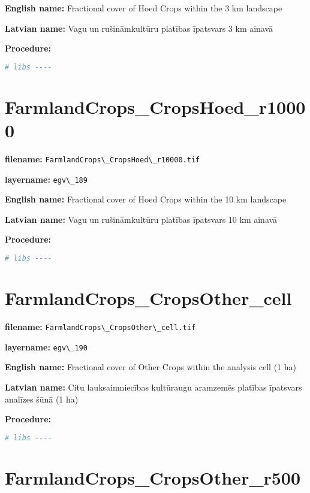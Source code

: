 \documentclass[
]{book}
\newcommand{\passthrough}[1]{#1}
\begin{document}
\textbf{English name:} Fractional cover of Hoed Crops within the 3 km landscape

\textbf{Latvian name:} Vagu un rušināmkultūru platības īpatsvars 3 km ainavā

\textbf{Procedure:}

\begin{lstlisting}[language=R]
# libs ----
\end{lstlisting}

\section{FarmlandCrops\_CropsHoed\_r10000}\label{ch06.189}

\textbf{filename:} \passthrough{\lstinline!FarmlandCrops\_CropsHoed\_r10000.tif!}

\textbf{layername:} \passthrough{\lstinline!egv\_189!}

\textbf{English name:} Fractional cover of Hoed Crops within the 10 km landscape

\textbf{Latvian name:} Vagu un rušināmkultūru platības īpatsvars 10 km ainavā

\textbf{Procedure:}

\begin{lstlisting}[language=R]
# libs ----
\end{lstlisting}

\section{FarmlandCrops\_CropsOther\_cell}\label{ch06.190}

\textbf{filename:} \passthrough{\lstinline!FarmlandCrops\_CropsOther\_cell.tif!}

\textbf{layername:} \passthrough{\lstinline!egv\_190!}

\textbf{English name:} Fractional cover of Other Crops within the analysis cell (1 ha)

\textbf{Latvian name:} Citu lauksaimniecības kultūraugu aramzemēs platības īpatsvars analīzes šūnā (1 ha)

\textbf{Procedure:}

\begin{lstlisting}[language=R]
# libs ----
\end{lstlisting}

\section{FarmlandCrops\_CropsOther\_r500}\label{ch06.191}
\end{document}
